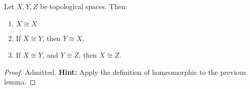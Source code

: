 \documentclass[12pt, twosided]{article}
\begin{document}
\begin{lm}
  Let \(X, Y, Z\) be topological spaces. Then:
  \begin{enumerate}
  \item \(X \cong X\)
  \item If \(X \cong Y\), then \(Y \cong X\),
  \item If \(X \cong Y\), and \(Y \cong Z\), then \(X \cong Z\).
  \end{enumerate}
\end{lm}
\begin{proof}
  Admitted.
  \textbf{Hint:} Apply the definition of homeomorphic to the previous lemma.
\end{proof}
\end{document}
